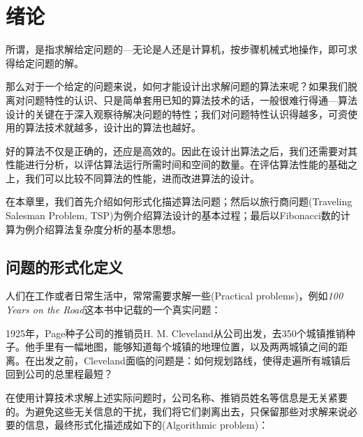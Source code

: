 \chapter{绪论}

	所谓，是指求解给定问题的---无论是人还是计算机，按步骤机械式地操作，即可求得给定问题的解。

	那么对于一个给定的问题来说，如何才能设计出求解问题的算法来呢？如果我们脱离对问题特性的认识、只是简单套用已知的算法技术的话，一般很难行得通---算法设计的关键在于深入观察待解决问题的特性；我们对问题特性认识得越多，可资使用的算法技术就越多，设计出的算法也越好。
	
	好的算法不仅是正确的，还应是高效的。因此在设计出算法之后，我们还需要对其性能进行分析，以评估算法运行所需时间和空间的数量。在评估算法性能的基础之上，我们可以比较不同算法的性能，进而改进算法的设计。
	
	 在本章里，我们首先介绍如何形式化描述算法问题；然后以旅行商问题(Traveling Salesman Problem, TSP)为例介绍算法设计的基本过程；最后以Fibonacci数的计算为例介绍算法复杂度分析的基本思想。
	
\section{问题的形式化定义}
   	
	人们在工作或者日常生活中，常常需要求解一些(Practical problems)，例如{\it 100 Years on the Road}\cite{100YearsOnTheRoad}这本书中记载的一个真实问题：
	
	{\kaishu 1925年，Page种子公司的推销员H. M. Cleveland从公司出发，去350个城镇推销种子。他手里有一幅地图，能够知道每个城镇的地理位置，以及两两城镇之间的距离。在出发之前，Cleveland面临的问题是：如何规划路线，使得走遍所有城镇后回到公司的总里程最短？}
		
	在使用计算技术求解上述实际问题时，公司名称、推销员姓名等信息是无关紧要的。为避免这些无关信息的干扰，我们将它们剥离出去，只保留那些对求解来说必要的信息，最终形式化描述成如下的(Algorithmic problem)：
	
\begin{center}
\end{center}
	
